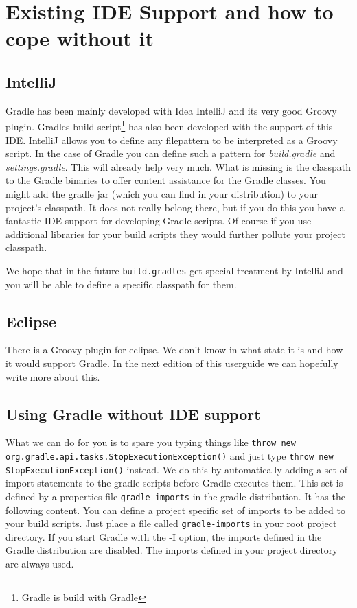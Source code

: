 \chapter{Existing IDE Support and how to cope without it} %
\label{cha:ide_support}
\section{IntelliJ} %
\label{sec:intellij}
Gradle has been mainly developed with Idea IntelliJ and its very good Groovy plugin. Gradles build script\footnote{Gradle is build with Gradle} has also been developed with the support of this IDE. IntelliJ allows you to define any filepattern to be interpreted as a Groovy script. In the case of Gradle you can define such a pattern for \emph{build.gradle} and \emph{settings.gradle}. This will already help very much. What is missing is the classpath to the Gradle binaries to offer content assistance for the Gradle classes. You might add the gradle jar (which you can find in your distribution) to your project's classpath. It does not really belong there, but if you do this you have a fantastic IDE support for developing Gradle scripts. Of course if you use additional libraries for your build scripts they would further pollute your project classpath.  

We hope that in the future \texttt{build.gradles} get special treatment by IntelliJ and you will be able to define a specific classpath for them.

\section{Eclipse} %
\label{sec:eclipse}
There is a Groovy plugin for eclipse. We don't know in what state it is and how it would support Gradle. In the next edition of this userguide we can hopefully write more about this.

\section{Using Gradle without IDE support} %
\label{sec:using_gradle_without_ide_support}
What we can do for you is to spare you typing things like \texttt{throw new org.gradle.api.tasks.StopExecutionException()} and just type \texttt{throw new StopExecutionException()} instead. We do this by automatically adding a set of import statements to the gradle scripts before Gradle executes them. This set is defined by a properties file \texttt{gradle-imports} in the gradle distribution. It has the following content.
You can define a project specific set of imports to be added to your build scripts. Just place a file called \texttt{gradle-imports} in your root project directory. If you start Gradle with the {-I} option, the imports defined in the Gradle distribution are disabled. The imports defined in your project directory are always used.

